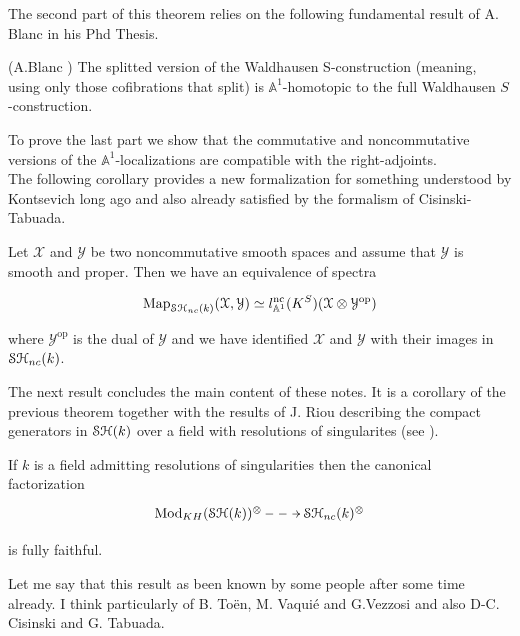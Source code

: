 \begin{refsection}
The second part of this theorem relies on the following fundamental result of A. Blanc in his Phd Thesis.

\begin{prop}(A.Blanc \cite[Prop. 4.6]{Anthony-thesis})
The splitted version of the Waldhausen S-construction (meaning, using only those cofibrations that split) is $\mathbb{A}^1$-homotopic to the full Waldhausen $S$-construction.
\end{prop}

To prove the last part we show that the commutative and noncommutative versions of the $\mathbb{A}^1$-localizations are compatible with the right-adjoints.\\


The following corollary provides a new formalization for something understood by Kontsevich \cite{kontsevich1, kontsevich2} long ago and also already satisfied by the formalism of Cisinski-Tabuada.

\begin{cor}
Let $\mathcal X$ and $\mathcal Y$ be two noncommutative smooth spaces and assume that $\mathcal Y$ is smooth and proper. Then we have an equivalence of spectra

$$
\mathrm{Map}_{\mathcal{S}\mathcal{H}_{nc}(k)}(\mathcal X, \mathcal Y)\simeq l_{\mathbb{A}^1}^\mathrm{nc}(K^S)(\mathcal X\otimes \mathcal Y^\mathrm{op})
$$

\noindent where $\mathcal Y^\mathrm{op}$ is the dual of $\mathcal Y$ and we have identified $\mathcal X$ and $\mathcal Y$ with their images in $\mathcal{S}\mathcal{H}_{nc}(k)$.
\end{cor}


The next result concludes the main content of these notes. It is a corollary of the previous theorem together with the results of J. Riou describing the compact generators in $\mathcal{S}\mathcal{H}(k)$ over a field with resolutions of singularites (see \cite{Riou-SHcompact}).




\begin{cor}
If $k$ is a field admitting resolutions of singularities then the canonical factorization 
$$\xymatrix{\mathrm{Mod}_{KH}(\stk)^{\otimes}\ar@{-->}[r]& \stncmonoidalk}$$

 \noindent is fully faithful.
\end{cor}

Let me say that this result as been known by some people after some time already. I think particularly of B. To\"en, M. Vaqui\'e and G.Vezzosi and also D-C. Cisinski and G. Tabuada.


\end{refsection}
